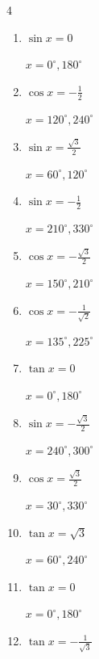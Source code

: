 \begin{multicols}{4}
\begin{enumerate}
        $\displaystyle x = 180^{\circ}$

  \item $\displaystyle \sin{x}  = 0$

        $\displaystyle x = 0^{\circ} , 180^{\circ}$

  \item $\displaystyle \cos{x}  = -\frac{1}{2}$

        $\displaystyle x = 120^{\circ} , 240^{\circ}$

  \item $\displaystyle \sin{x}  = \frac{\sqrt{3}}{2}$

        $\displaystyle x = 60^{\circ} , 120^{\circ}$

  \item $\displaystyle \sin{x}  = -\frac{1}{2}$

        $\displaystyle x = 210^{\circ} , 330^{\circ}$

  \item $\displaystyle \cos{x}  = -\frac{\sqrt{3}}{2}$

        $\displaystyle x = 150^{\circ} , 210^{\circ}$

  \item $\displaystyle \cos{x}  = -\frac{1}{\sqrt{2}}$

        $\displaystyle x = 135^{\circ} , 225^{\circ}$

  \item $\displaystyle \tan{x}  = 0$

        $\displaystyle x = 0^{\circ} , 180^{\circ}$

  \item $\displaystyle \sin{x}  = -\frac{\sqrt{3}}{2}$

        $\displaystyle x = 240^{\circ} , 300^{\circ}$

  \item $\displaystyle \cos{x}  = \frac{\sqrt{3}}{2}$

        $\displaystyle x = 30^{\circ} , 330^{\circ}$

  \item $\displaystyle \tan{x}  = \sqrt{3}$

        $\displaystyle x = 60^{\circ} , 240^{\circ}$

  \item $\displaystyle \tan{x}  = 0$

        $\displaystyle x = 0^{\circ} , 180^{\circ}$

  \item $\displaystyle \tan{x}  = -\frac{1}{\sqrt{3}}$


\end{enumerate}
\end{multicols}
